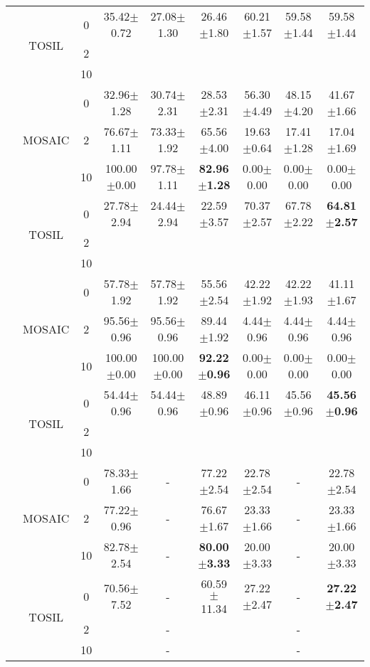 \begin{table}[t]
{\begin{tabular}{|c|c|c|c|c|c|c|c|c|}
  \cline{2-9}
   & \multirow{3}{*}{TOSIL} & 0 & 35.42$\pm$0.72 & 27.08$\pm$1.30 & 26.46$\pm$1.80 & 60.21$\pm$1.57 & 59.58$\pm$1.44 & 59.58$\pm$1.44 \\ 
  \cline{3-9}
   &  & 2 &  &  &  &  &  &  \\ 
  \cline{3-9}
   &  & 10 &  &  &  &  &  &  \\ 
  \hhline{|=========|}
  \multirow{6}{*}{\rotatebox[origin=c]{90}{Stack-Block}} & \multirow{3}{*}{MOSAIC} & 0 & 32.96$\pm$1.28 & 30.74$\pm$2.31 & 28.53$\pm$2.31 & 56.30$\pm$4.49 & 48.15$\pm$4.20 & 41.67$\pm$1.66 \\ 
  \cline{3-9}
   &  & 2 & 76.67$\pm$1.11 & 73.33$\pm$1.92 & 65.56$\pm$4.00 & 19.63$\pm$0.64 & 17.41$\pm$1.28 & 17.04$\pm$1.69 \\ 
  \cline{3-9}
   &  & 10 & 100.00$\pm$0.00 & 97.78$\pm$1.11 & \textbf{82.96$\pm$1.28} & 0.00$\pm$0.00 & 0.00$\pm$0.00 & 0.00$\pm$0.00 \\ 
  \cline{2-9}
   & \multirow{3}{*}{TOSIL} & 0 & 27.78$\pm$2.94 & 24.44$\pm$2.94 & 22.59$\pm$3.57 & 70.37$\pm$2.57 & 67.78$\pm$2.22 & \textbf{64.81$\pm$2.57} \\ 
  \cline{3-9}
   &  & 2 &  &  &  &  &  &  \\ 
  \cline{3-9}
   &  & 10 &  &  &  &  &  &  \\ 
  \hhline{|=========|}
  \multirow{6}{*}{\rotatebox[origin=c]{90}{Nut-Assembly}} & \multirow{3}{*}{MOSAIC} & 0 & 57.78$\pm$1.92 & 57.78$\pm$1.92 & 55.56$\pm$2.54 & 42.22$\pm$1.92 & 42.22$\pm$1.93 & 41.11$\pm$1.67 \\ 
  \cline{3-9}
   &  & 2 & 95.56$\pm$0.96 & 95.56$\pm$0.96 & 89.44$\pm$1.92 & 4.44$\pm$0.96 & 4.44$\pm$0.96 & 4.44$\pm$0.96 \\ 
  \cline{3-9}
   &  & 10 & 100.00$\pm$0.00 & 100.00$\pm$0.00 & \textbf{92.22$\pm$0.96} & 0.00$\pm$0.00 & 0.00$\pm$0.00 & 0.00$\pm$0.00 \\ 
  \cline{2-9}
   & \multirow{3}{*}{TOSIL} & 0 & 54.44$\pm$0.96 & 54.44$\pm$0.96 & 48.89$\pm$0.96 & 46.11$\pm$0.96 & 45.56$\pm$0.96 & \textbf{45.56$\pm$0.96} \\ 
  \cline{3-9}
   &  & 2 &  &  &  &  &  &  \\ 
  \cline{3-9}
   &  & 10 &  &  &  &  &  &  \\ 
  \hhline{|=========|}
  \multirow{6}{*}{\rotatebox[origin=c]{90}{Press-Button}} & \multirow{3}{*}{MOSAIC} & 0 & 78.33$\pm$1.66 & - & 77.22$\pm$2.54 & 22.78$\pm$2.54 & - & 22.78$\pm$2.54 \\ 
  \cline{3-9}
   &  & 2 & 77.22$\pm$0.96 & - & 76.67$\pm$1.67 & 23.33$\pm$1.66 & - & 23.33$\pm$1.66 \\ 
  \cline{3-9}
   &  & 10 & 82.78$\pm$2.54 & - & \textbf{80.00$\pm$3.33} & 20.00$\pm$3.33 & - & 20.00$\pm$3.33 \\ 
  \cline{2-9}
   & \multirow{3}{*}{TOSIL} & 0 & 70.56$\pm$7.52 & - & 60.59$\pm$11.34 & 27.22$\pm$2.47 & - & \textbf{27.22$\pm$2.47} \\ 
  \cline{3-9}
   &  & 2 &  & - &  &  & - &  \\ 
  \cline{3-9}
   &  & 10 &  & - &  &  & - &  \\
  \hline
  \end{tabular}
  }
  \end{table}